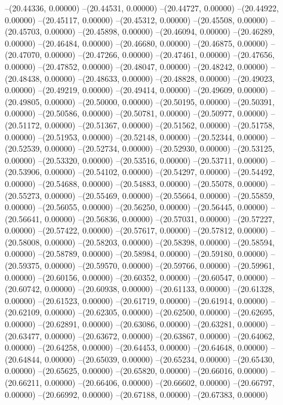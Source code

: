 --(20.44336, 0.00000)
--(20.44531, 0.00000)
--(20.44727, 0.00000)
--(20.44922, 0.00000)
--(20.45117, 0.00000)
--(20.45312, 0.00000)
--(20.45508, 0.00000)
--(20.45703, 0.00000)
--(20.45898, 0.00000)
--(20.46094, 0.00000)
--(20.46289, 0.00000)
--(20.46484, 0.00000)
--(20.46680, 0.00000)
--(20.46875, 0.00000)
--(20.47070, 0.00000)
--(20.47266, 0.00000)
--(20.47461, 0.00000)
--(20.47656, 0.00000)
--(20.47852, 0.00000)
--(20.48047, 0.00000)
--(20.48242, 0.00000)
--(20.48438, 0.00000)
--(20.48633, 0.00000)
--(20.48828, 0.00000)
--(20.49023, 0.00000)
--(20.49219, 0.00000)
--(20.49414, 0.00000)
--(20.49609, 0.00000)
--(20.49805, 0.00000)
--(20.50000, 0.00000)
--(20.50195, 0.00000)
--(20.50391, 0.00000)
--(20.50586, 0.00000)
--(20.50781, 0.00000)
--(20.50977, 0.00000)
--(20.51172, 0.00000)
--(20.51367, 0.00000)
--(20.51562, 0.00000)
--(20.51758, 0.00000)
--(20.51953, 0.00000)
--(20.52148, 0.00000)
--(20.52344, 0.00000)
--(20.52539, 0.00000)
--(20.52734, 0.00000)
--(20.52930, 0.00000)
--(20.53125, 0.00000)
--(20.53320, 0.00000)
--(20.53516, 0.00000)
--(20.53711, 0.00000)
--(20.53906, 0.00000)
--(20.54102, 0.00000)
--(20.54297, 0.00000)
--(20.54492, 0.00000)
--(20.54688, 0.00000)
--(20.54883, 0.00000)
--(20.55078, 0.00000)
--(20.55273, 0.00000)
--(20.55469, 0.00000)
--(20.55664, 0.00000)
--(20.55859, 0.00000)
--(20.56055, 0.00000)
--(20.56250, 0.00000)
--(20.56445, 0.00000)
--(20.56641, 0.00000)
--(20.56836, 0.00000)
--(20.57031, 0.00000)
--(20.57227, 0.00000)
--(20.57422, 0.00000)
--(20.57617, 0.00000)
--(20.57812, 0.00000)
--(20.58008, 0.00000)
--(20.58203, 0.00000)
--(20.58398, 0.00000)
--(20.58594, 0.00000)
--(20.58789, 0.00000)
--(20.58984, 0.00000)
--(20.59180, 0.00000)
--(20.59375, 0.00000)
--(20.59570, 0.00000)
--(20.59766, 0.00000)
--(20.59961, 0.00000)
--(20.60156, 0.00000)
--(20.60352, 0.00000)
--(20.60547, 0.00000)
--(20.60742, 0.00000)
--(20.60938, 0.00000)
--(20.61133, 0.00000)
--(20.61328, 0.00000)
--(20.61523, 0.00000)
--(20.61719, 0.00000)
--(20.61914, 0.00000)
--(20.62109, 0.00000)
--(20.62305, 0.00000)
--(20.62500, 0.00000)
--(20.62695, 0.00000)
--(20.62891, 0.00000)
--(20.63086, 0.00000)
--(20.63281, 0.00000)
--(20.63477, 0.00000)
--(20.63672, 0.00000)
--(20.63867, 0.00000)
--(20.64062, 0.00000)
--(20.64258, 0.00000)
--(20.64453, 0.00000)
--(20.64648, 0.00000)
--(20.64844, 0.00000)
--(20.65039, 0.00000)
--(20.65234, 0.00000)
--(20.65430, 0.00000)
--(20.65625, 0.00000)
--(20.65820, 0.00000)
--(20.66016, 0.00000)
--(20.66211, 0.00000)
--(20.66406, 0.00000)
--(20.66602, 0.00000)
--(20.66797, 0.00000)
--(20.66992, 0.00000)
--(20.67188, 0.00000)
--(20.67383, 0.00000)
